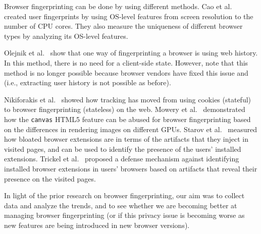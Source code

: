 Browser fingerprinting can be done by using different methods. Cao et
al.~\cite{Cao} created user fingerprints by using OS-level features
from screen resolution to the number of CPU cores. They also measure
the uniqueness of different browser types by analyzing its OS-level
features.

Olejnik et al.~\cite{Olejnik} show that one way of fingerprinting a
browser is using web history. In this method, there is no need for a
client-side state. However, note that this method is no longer
possible because browser vendors have fixed this issue and (i.e.,
extracting user history is not possible as before).

Nikiforakis et al.~\cite{cookiemonster-SP13} showed how tracking has
moved from using cookies (stateful) to browser fingerprinting
(stateless) on the web. Mowery et al.~\cite{mowery2012pixel}
demonstrated how the \texttt{canvas} HTML5 feature can be abused for
browser fingerprinting based on the differences in rendering images on
different GPUs. Starov et al.~\cite{extbloat-www2019} measured how
bloated browser extensions are in terms of the artifacts that they
inject in visited pages, and can be used to identify the presence of
the users' installed extensions.  Trickel et al.~\cite{cloakx-sec19}
proposed a defense mechanism against identifying installed browser
extensions in users' browsers based on artifacts that reveal their
presence on the visited pages.

In light of the prior research on browser fingerprinting, our aim was
to collect data and analyze the trends, and to see whether we are
becoming better at managing browser fingerprinting (or if this privacy
issue is becoming worse as new features are being introduced in new
browser versions).
